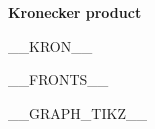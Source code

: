 \textbf{Kronecker product}\\[0.3em]
\begingroup
\setlength{\textwidth}{\linewidth}
\begin{center}
__KRON__
\end{center}
\endgroup

\vspace{0.8em}
\noindent\begin{minipage}[t]{0.56\textwidth}\vspace{0pt}
\begingroup
\setlength{\textwidth}{\linewidth}
\begin{center}
__FRONTS__
\end{center}
\endgroup
\end{minipage}\hfill%
\noindent\begin{minipage}[t]{0.40\textwidth}\vspace{0pt}
__GRAPH_TIKZ__
\end{minipage}
